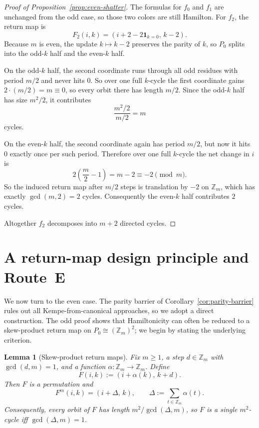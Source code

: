 \documentclass[11pt]{article}
\newtheorem{lemma}{Lemma}
\begin{document}
\begin{proof}[Proof of Proposition~\ref{prop:even-shatter}]
The formulas for $f_0$ and $f_1$ are unchanged from the odd case, so those two colors are still Hamilton.
For $f_2$, the return map is
\[
F_2(i,k)=(i+2-2\mathbf 1_{k=0},\,k-2).
\]
Because $m$ is even, the update $k\mapsto k-2$ preserves the parity of $k$, so $P_0$ splits into the odd-$k$ half and the even-$k$ half.

On the odd-$k$ half, the second coordinate runs through all odd residues with period $m/2$ and never hits $0$.
So over one full $k$-cycle the first coordinate gains $2\cdot(m/2)=m\equiv 0$, so every orbit there has length $m/2$.
Since the odd-$k$ half has size $m^2/2$, it contributes
\[
\frac{m^2/2}{m/2}=m
\]
cycles.

On the even-$k$ half, the second coordinate again has period $m/2$, but now it hits $0$ exactly once per such period.
Therefore over one full $k$-cycle the net change in $i$ is
\[
2\left(\frac m2-1\right)=m-2\equiv -2 \pmod m.
\]
So the induced return map after $m/2$ steps is translation by $-2$ on $\mathbb Z_m$, which has exactly $\gcd(m,2)=2$ cycles.
Consequently the even-$k$ half contributes $2$ cycles.

Altogether $f_2$ decomposes into $m+2$ directed cycles.
\end{proof}


\section{A return-map design principle and Route~E}\label{sec:even}

We now turn to the even case.
The parity barrier of Corollary~\ref{cor:parity-barrier} rules out all Kempe-from-canonical approaches, so we adopt a direct construction.
The odd proof shows that Hamiltonicity can often be reduced to a skew-product return map on $P_0\cong (\mathbb Z_m)^2$; we begin by stating the underlying criterion.

\begin{lemma}[Skew-product return maps]\label{lem:skew-product}
Fix $m\ge 1$, a step $d\in \mathbb Z_m$ with $\gcd(d,m)=1$, and a function $\alpha:\mathbb Z_m\to\mathbb Z_m$.
Define
\[
F(i,k):=(i+\alpha(k),\,k+d).
\]
Then $F$ is a permutation and
\[
F^m(i,k)=(i+\Delta,\,k),\qquad \Delta:=\sum_{t\in\mathbb Z_m}\alpha(t).
\]
Consequently, every orbit of $F$ has length $m^2/\gcd(\Delta,m)$, so $F$ is a single $m^2$-cycle iff $\gcd(\Delta,m)=1$.
\end{lemma}
\end{document}

